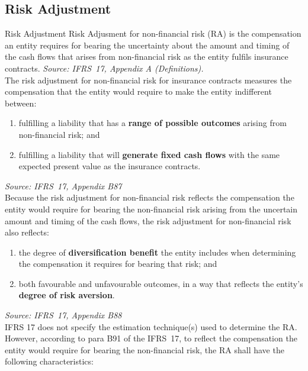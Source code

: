 \documentclass[aspectratio=169]{beamer}
\begin{document}
\subsection{Risk Adjustment}
\begin{frame}[allowframebreaks]{Risk Adjustment}
Risk Adjusment for non-financial risk (RA) is the compensation an entity requires for bearing the uncertainty about the amount and timing of the cash flows that arises from non-financial risk as the entity fulfils insurance contracts.
  \vspace{0.2em}
  \footnotesize
  \textit{Source: IFRS~17, Appendix A (Definitions).}\\
  \vspace{0.4em}
  \normalsize
The risk adjustment for non-financial risk for insurance contracts measures the compensation that the entity would require to make the entity indifferent between:
\begin{enumerate}
\item fulfilling a liability that has a \textbf{range of possible outcomes} arising from non-financial risk; and
\item fulfilling a liability that will \textbf{generate fixed cash flows} with the same expected present value as the insurance contracts.
\end{enumerate}  \vspace{0.2em}
\footnotesize
\textit{Source: IFRS~17, Appendix B87}\\
\vspace{0.4em}
\normalsize
\framebreak
Because the risk adjustment for non-financial risk reflects the compensation the entity would require for bearing the non-financial risk arising from the uncertain amount and timing of the cash flows, the risk adjustment for non-financial risk also reflects:
\begin{enumerate}
\item the degree of \textbf{diversification benefit} the entity includes when determining the compensation it requires for bearing that risk; and
\item both favourable and unfavourable outcomes, in a way that reflects the entity’s \textbf{degree of risk aversion}.
\end{enumerate}
\footnotesize
\textit{Source: IFRS~17, Appendix B88}\\
\vspace{0.4em}
\normalsize
\framebreak
IFRS 17 does not specify the estimation technique(s) used to determine the RA. However, according to para B91 of the IFRS~17, to reflect the compensation the entity would require for bearing the non-financial risk, the RA shall have the following characteristics:

\end{frame}
\end{document}
